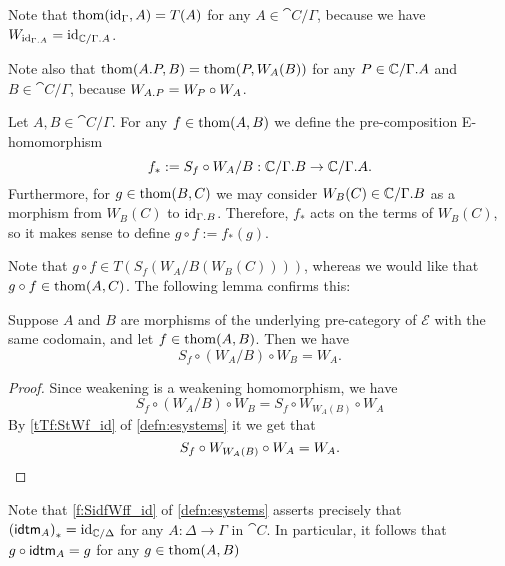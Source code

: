 \begin{rmk}
Note that $\mathrm{thom}({\mathrm{id}_{\Gamma}},A)=T(A)$ for any $A\in\cat{C}/\Gamma$, 
because we have $W_{\catid{\ctxext{\Gamma}{A}}}=\catid{\cat{C}/\ctxext{\Gamma}{A}}$.

Note also that $\thom{\ctxext{A}{P}}{B}=\thom{P}{W_A(B)}$ for any $P\in\cat{C}/\ctxext{\Gamma}{A}$
and $B\in\cat{C}/\Gamma$, because $W_{\ctxext{A}{P}}=
W_P\circ W_A$.
\end{rmk}

\begin{defn}
Let $A,B\in\cat{C}/\Gamma$.
For any $f\in\mathrm{thom}(A,B)$ we define the pre-composition E-homomorphism
\begin{equation*}
f_\ast := S_f\circ W_A/B : \cat{C}/\ctxext{\Gamma}{B}\to\cat{C}/\ctxext{\Gamma}{A}.
\end{equation*}
Furthermore, for $g\in\mathrm{thom}(B,C)$ we may consider $W_B(C)\in\cat{C}/\ctxext{\Gamma}{B}$ as a morphism from $W_B(C)$ to $\catid{\ctxext{\Gamma}{B}}$. Therefore, $f_\ast$ acts on the terms of
$W_B(C)$, so it makes sense to define $g\circ f:=f_\ast(g)$. 
\end{defn}

Note that $g\circ f\in T(S_f(W_A/B(W_B(C))))$, whereas we would like that
$g\circ f\in\mathrm{thom}(A,C)$. The following lemma confirms this:

\begin{lem}
Suppose $A$ and $B$ are morphisms of the underlying pre-category of $\mathcal{E}$
with the same codomain, and let $f\in\mathrm{thom}(A,B)$. Then we have 
\begin{equation*}
S_f\circ (W_A/B)\circ W_B=W_A.
\end{equation*}
\end{lem}

\begin{proof}
Since weakening is a weakening homomorphism, we have
\begin{equation*}
S_f\circ (W_A/B)\circ W_B=S_f\circ W_{W_A(B)}\circ W_A
\end{equation*}
By \autoref{tTf:StWf_id} of \autoref{defn:esystems} it we get that
\begin{equation*}
S_f\circ W_{W_A(B)}\circ W_A=W_A.\qedhere
\end{equation*}
\end{proof}

\begin{rmk}
Note that \autoref{f:SidfWff_id} of \autoref{defn:esystems} asserts precisely
that ${(\tfid{A})}_\ast=\catid{\cat{C}/\Delta}$ for any $A:\Delta\to \Gamma$ in $\cat{C}$. In
particular, it follows that $g\circ\tfid{A}=g$ for any $g\in\mathrm{thom}(A,B)$
\end{rmk}

